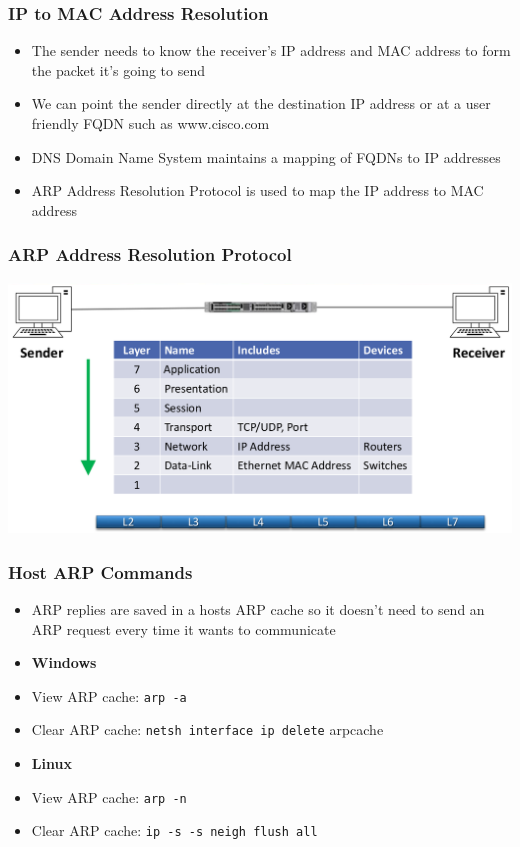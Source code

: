 \documentclass[pdflatex,compress,mathserif]{beamer}
\begin{document}
\begin{frame}
	\frametitle{IP to MAC Address Resolution}
	\begin{itemize}
		\item The sender needs to know the receiver’s IP address and MAC address to form the packet it’s going to send
		\item We can point the sender directly at the destination IP address or at a user friendly FQDN such as www.cisco.com
		\item DNS Domain Name System maintains a mapping of FQDNs to IP addresses
		\item ARP Address Resolution Protocol is used to map the IP address to MAC address
	\end{itemize}
\end{frame}

\begin{frame}
	\frametitle{ARP Address Resolution Protocol}
	\begin{center}
		\includegraphics[width=\linewidth]{img/img07}
	\end{center}
\end{frame}

\begin{frame}
	\frametitle{Host ARP Commands}
	\begin{itemize}
		\item ARP replies are saved in a hosts ARP cache so it doesn’t need to send an ARP request every time it wants to communicate
		\item \textbf{Windows}
		\item[] View ARP cache: \texttt{arp -a}
		\item[] Clear ARP cache: \texttt{netsh interface ip delete} arpcache
		\item \textbf{Linux}
		\item[] View ARP cache: \texttt{arp -n}
		\item[] Clear ARP cache: \texttt{ip -s -s neigh flush all}
	\end{itemize}
\end{frame}
\end{document}
